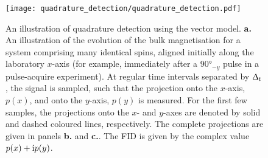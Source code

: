 \begin{figure}
    \centering
    \texttt{[image: quadrature\_detection/quadrature\_detection.pdf]}
    \caption[
        An simple illustration of quadrature detection.
    ]{
        An illustration of quadrature detection using the vector
        model\cite[Chapter 1]{Hore2015}.
        \textbf{a.} An illustration of the evolution of the bulk magnetisation
        for a system comprising many identical spins, aligned initially along
        the laboratory $x$-axis (for example, immediately after a
        $\ang{90}_{-y}$ pulse in a pulse-acquire experiment). At regular time
        intervals separated by $\Updelta_t$, the signal is sampled, such that the
        projection onto the $x$-axis, $p(x)$, and onto the $y$-axis, $p(y)$ is
        measured. For the first few samples, the projections onto the $x$- and
        $y$-axes are denoted by solid and dashed coloured lines, respectively.
        The complete projections are given in panels \textbf{b.} and
        \textbf{c.}. The \ac{FID} is given by the complex value $p(x) + \mathrm{i} p(y)$.
    }\label{fig:quadrature}
\end{figure}

